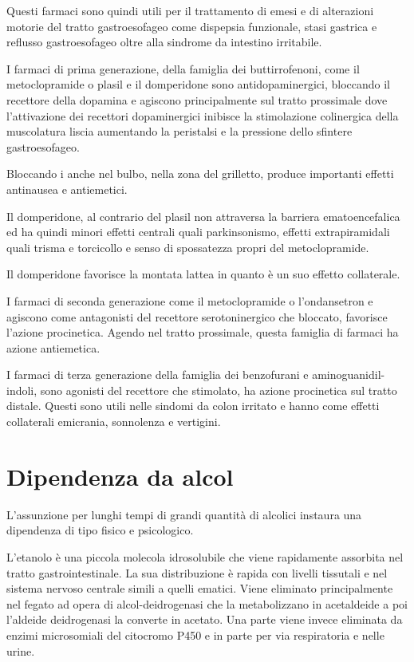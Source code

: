 Questi farmaci sono quindi utili per il trattamento di emesi e di alterazioni motorie del tratto  gastroesofageo come dispepsia funzionale, stasi gastrica e reflusso gastroesofageo oltre alla sindrome da intestino irritabile.

I farmaci di prima generazione, della famiglia dei buttirrofenoni, come il metoclopramide o plasil e il domperidone sono antidopaminergici, bloccando il recettore  della dopamina e agiscono principalmente sul tratto prossimale dove l'attivazione dei recettori dopaminergici inibisce la stimolazione colinergica della muscolatura liscia aumentando la peristalsi e la pressione dello sfintere gastroesofageo.

Bloccando i  anche nel bulbo, nella zona del grilletto, produce importanti effetti antinausea e antiemetici.

Il domperidone, al contrario del plasil non attraversa la barriera ematoencefalica ed ha quindi minori effetti centrali quali parkinsonismo, effetti extrapiramidali quali trisma e torcicollo e senso di spossatezza propri del metoclopramide.

Il domperidone favorisce la montata lattea in quanto è un suo effetto collaterale.

I farmaci di seconda generazione come il metoclopramide o l'ondansetron e agiscono come antagonisti del recettore serotoninergico  che bloccato, favorisce l'azione procinetica. Agendo nel tratto prossimale, questa famiglia di farmaci ha azione antiemetica.

I farmaci di terza generazione della famiglia dei benzofurani e aminoguanidil-indoli, sono agonisti del recettore  che stimolato, ha azione procinetica sul tratto distale. Questi sono utili nelle sindomi da colon irritato e hanno come effetti collaterali emicrania, sonnolenza e vertigini.

\section{Dipendenza da alcol}

L'assunzione per lunghi tempi di grandi quantità di alcolici instaura una dipendenza di tipo fisico e psicologico.

L'etanolo è una piccola molecola idrosolubile che viene rapidamente assorbita nel tratto gastrointestinale. La sua distribuzione è rapida con livelli tissutali e nel sistema nervoso centrale simili a quelli ematici. Viene eliminato principalmente nel fegato ad opera di alcol-deidrogenasi che la metabolizzano in acetaldeide a poi l'aldeide deidrogenasi la converte in acetato. Una parte viene invece eliminata da enzimi microsomiali del citocromo P450 e in parte per via respiratoria e nelle urine.

